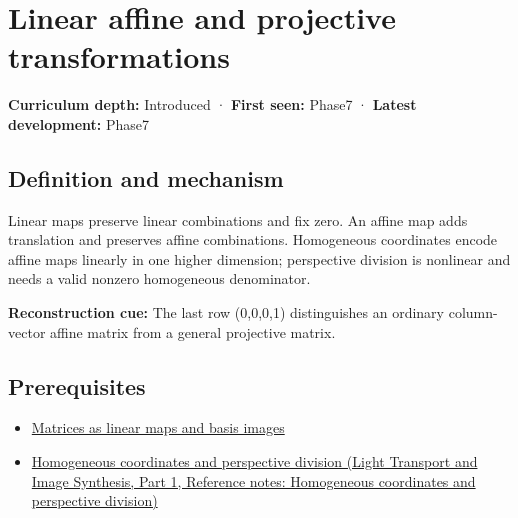 \hypertarget{appendix-0bf0ca73f735}{}\label{referencestart:appendix-0bf0ca73f735}
\section{Linear affine and projective transformations}\label{appendix-0bf0ca73f735-linear-affine-and-projective-transformations}

\hypertarget{appendix-0bf0ca73f735-linear-affine-and-projective-transformations}{}

\textbf{Curriculum depth:} Introduced · \textbf{First seen:} Phase7 · \textbf{Latest development:} Phase7

\begin{allmightroledefinition}

\subsection{Definition and mechanism}\label{appendix-0bf0ca73f735-definition-and-mechanism}

\hypertarget{appendix-0bf0ca73f735-definition-and-mechanism}{}

Linear maps preserve linear combinations and fix zero. An affine map adds translation and preserves affine combinations. Homogeneous coordinates encode affine maps linearly in one higher dimension; perspective division is nonlinear and needs a valid nonzero homogeneous denominator.

\end{allmightroledefinition}

\textbf{Reconstruction cue:} The last row (0,0,0,1) distinguishes an ordinary column-vector affine matrix from a general projective matrix.

\subsection{Prerequisites}\label{appendix-0bf0ca73f735-prerequisites}

\hypertarget{appendix-0bf0ca73f735-prerequisites}{}

\begin{itemize}
\tightlist
\item
  \hyperref[appendix-bd39c3bf5d64]{Matrices as linear maps and basis images}
\item
  \href{../04-Light-Transport-and-Image-Synthesis-P01/main.pdf\#nameddest=appendix-cb3b26862282}{Homogeneous coordinates and perspective division (Light Transport and Image Synthesis, Part 1, Reference notes: Homogeneous coordinates and perspective division)}
\end{itemize}

